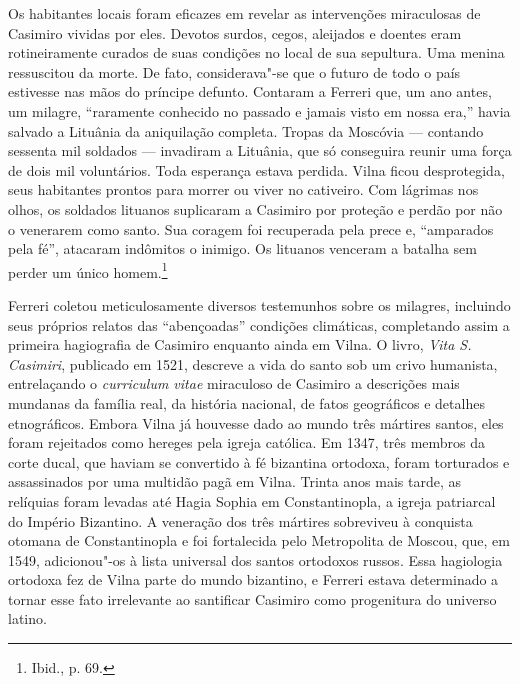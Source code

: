Os habitantes locais foram eficazes em revelar as intervenções
miraculosas de Casimiro vividas por eles. Devotos surdos, cegos,
aleijados e doentes eram rotineiramente curados de suas condições no
local de sua sepultura. Uma menina ressuscitou da morte. De fato,
considerava"-se que o futuro de todo o país estivesse nas mãos do
príncipe defunto. Contaram a Ferreri que, um ano antes, um milagre,
``raramente conhecido no passado e jamais visto em nossa era,'' havia
salvado a Lituânia da aniquilação completa. Tropas da Moscóvia ---
contando sessenta mil soldados --- invadiram a Lituânia, que só conseguira
reunir uma força de dois mil voluntários. Toda esperança estava perdida.
Vilna ficou desprotegida, seus habitantes prontos para morrer ou viver
no cativeiro. Com lágrimas nos olhos, os soldados lituanos suplicaram a
Casimiro por proteção e perdão por não o venerarem como santo. Sua
coragem foi recuperada pela prece e, ``amparados pela fé'', atacaram
indômitos o inimigo. Os lituanos venceram a batalha sem perder um único
homem.\footnote{Ibid., p. 69.}

%

Ferreri coletou meticulosamente diversos testemunhos sobre os milagres,
incluindo seus próprios relatos das ``abençoadas'' condições climáticas,
completando assim a primeira hagiografia de Casimiro enquanto ainda em
Vilna. O livro, \textit{Vita S. Casimiri}, publicado em 1521, descreve a
vida do santo sob um crivo humanista, entrelaçando o \textit{curriculum
vitae} miraculoso de Casimiro a descrições mais mundanas da família
real, da história nacional, de fatos geográficos e detalhes
etnográficos. Embora Vilna já houvesse dado ao mundo três mártires
santos, eles foram rejeitados como hereges pela igreja católica. Em
1347, três membros da corte ducal, que haviam se convertido à fé
bizantina ortodoxa, foram torturados e assassinados por uma multidão
pagã em Vilna. Trinta anos mais tarde, as relíquias foram levadas até
Hagia Sophia em Constantinopla, a igreja patriarcal do Império
Bizantino. A veneração dos três mártires sobreviveu à conquista otomana
de Constantinopla e foi fortalecida pelo Metropolita de Moscou, que, em
1549, adicionou"-os à lista universal dos santos ortodoxos russos. Essa
hagiologia ortodoxa fez de Vilna parte do mundo bizantino, e Ferreri
estava determinado a tornar esse fato irrelevante ao santificar Casimiro
como progenitura do universo latino.

